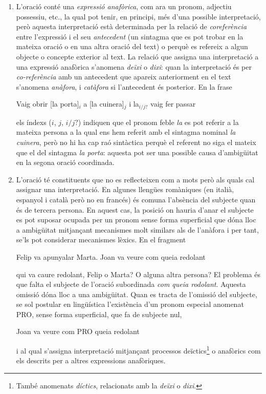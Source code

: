 \begin{enumerate}
\item L'oració conté una \emph{expressió anafòrica}, com ara un
  pronom, adjectiu possessiu, etc., la qual pot tenir, en principi,
  més d'una possible interpretació, però aquesta interpretació està
  determinada per la relació de \emph{coreferència} entre l'expressió
  i el seu \emph{antecedent} (un sintagma que es pot trobar en la
  mateixa oració o en una altra oració del text) o perquè es refereix
  a algun objecte o concepte exterior al text. La relació que assigna
  una interpretació a una expressió anafòrica s'anomena \emph{deïxi} o
  \emph{dixi}: quan la interpretació és per \emph{co-referència} amb
  un antecedent que apareix anteriorment en el text s'anomena {\em
    anàfora}\label{pg:anafora}, i \emph{catàfora} si l'antecedent és
  posterior.  En la frase
\begin{exemple}
Vaig obrir [la porta]$_i$ a [la cuinera]$_j$ i la$_{i/j?}$ vaig fer passar
\end{exemple}
els índexs ($i$, $j$, $i/j?$) indiquen que el pronom feble \emph{la} es
pot referir a la mateixa persona a la qual ens hem referit amb el
sintagma nominal \emph{la cuinera}, però no hi ha cap raó sintàctica
perquè el referent no siga el mateix que el del sintagma \emph{la
  porta}: aquesta pot ser una possible causa d'ambigüitat en la segona
oració coordinada.

  
\item L'oració té constituents que no es reflecteixen com a mots però
  als quals cal assignar una interpretació. En algunes llengües
  romàniques (en italià, espanyol i català però no en francés) és
  comuna l'absència del subjecte quan és de tercera persona. En aquest
  cas, la posició on hauria d'anar el subjecte es pot suposar ocupada
  per un pronom sense forma superficial que dóna lloc a ambigüitat
  mitjançant mecanismes molt similars als de l'anàfora i per tant,
  se'ls pot considerar mecanismes lèxics.  En el fragment
  \begin{exemple}
  Felip va apunyalar Marta. Joan va veure com queia redolant
  \end{exemple}
  qui va caure redolant, Felip o Marta?  O alguna altra persona?  El
  problema és que falta el subjecte de l'oració subordinada \emph{com
    queia rodolant}. Aquesta omissió dóna lloc a una ambigüitat. Quan
  es tracta de l'omissió del subjecte, se sol postular en lingüística
  l'existència d'un pronom especial anomenat PRO, sense forma
  superficial, que fa de subjecte nul,
  \begin{exemple}
    Joan va veure com PRO queia redolant
  \end{exemple}
  i al qual s'assigna interpretació mitjançant processos
  deïctics\footnote{També anomenats \emph{díctics}, relacionats amb la
  \emph{deïxi} o \emph{dixi}.} o anafòrics com
  els descrits per a altres expressions anafòriques.
  

\end{enumerate}
